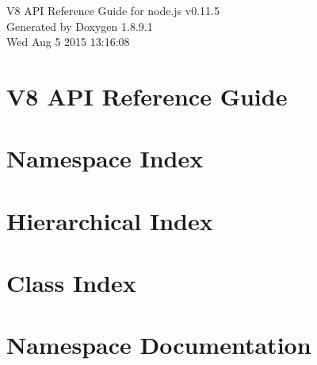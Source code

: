 \documentclass[twoside]{book}
\newcommand{\+}{\discretionary{\mbox{\scriptsize$\hookleftarrow$}}{}{}}
\newcommand{\clearemptydoublepage}{%
  \newpage{\pagestyle{empty}\cleardoublepage}%
}
\begin{document}
\hypersetup{pageanchor=false,
             bookmarks=true,
             bookmarksnumbered=true,
             pdfencoding=unicode
            }
\begin{titlepage}
\vspace*{7cm}
\begin{center}%
{\Large V8 A\+P\+I Reference Guide for node.\+js v0.11.5 }\\
\vspace*{1cm}
{\large Generated by Doxygen 1.8.9.1}\\
\vspace*{0.5cm}
{\small Wed Aug 5 2015 13:16:08}\\
\end{center}
\end{titlepage}
\clearemptydoublepage
\tableofcontents
\clearemptydoublepage
{}
\hypersetup{pageanchor=true}

\chapter{V8 A\+P\+I Reference Guide}
\label{index}\hypertarget{index}{}
\chapter{Namespace Index}

\chapter{Hierarchical Index}

\chapter{Class Index}

\chapter{Namespace Documentation}

\end{document}
